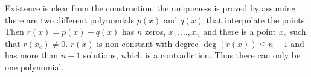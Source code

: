 \documentclass[12pt]{article}
\begin{document}
Existence is clear from the construction, the uniqueness is proved by assuming there are two different polynomials $p(x)$ and $q(x)$ that interpolate the points. Then $r(x)=p(x)-q(x)$ has $n$ zeros, $x_1,\ldots, x_n$ and there is a point $x_e$ such that $r(x_e)\neq 0$. $r(x)$ is non-constant with degree $\deg(r(x))\leq n-1$ and has more than $n-1$ solutions, which is a contradiction. Thus there can only be one polynomial.
\end{document}
